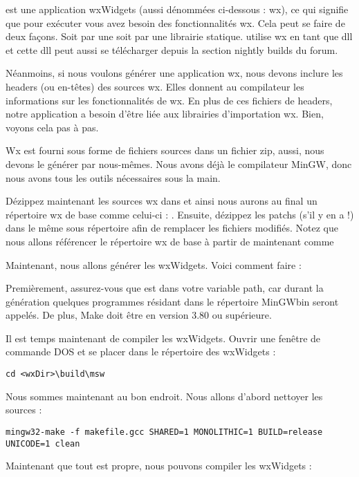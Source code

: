 \codeblocks est une application wxWidgets (aussi dénommées ci-dessous : wx), ce qui signifie que pour exécuter \codeblocks vous avez besoin des fonctionnalités wx. Cela peut se faire de deux façons. Soit par une  soit par une librairie statique. \codeblocks utilise wx en tant que dll et cette dll peut aussi se télécharger depuis la section nightly builds du forum.

Néanmoins, si nous voulons générer une application wx, nous devons inclure les headers (ou en-têtes) des sources wx. Elles donnent au compilateur les informations sur les fonctionnalités de wx. En plus de ces fichiers de headers, notre application a besoin d'être liée aux librairies d'importation wx. Bien, voyons cela pas à pas.

Wx est fourni sous forme de fichiers sources dans un fichier zip, aussi, nous devons le générer par nous-mêmes. Nous avons déjà le compilateur MinGW, donc nous avons tous les outils nécessaires sous la main.

Dézippez maintenant les sources wx dans  et ainsi nous aurons au final un répertoire wx de base comme celui-ci : . Ensuite, dézippez les patchs (s'il y en a !) dans le même sous répertoire afin de remplacer les fichiers modifiés. Notez que nous allons référencer le répertoire wx de base à partir de maintenant comme 

Maintenant, nous allons générer les wxWidgets. Voici comment faire :

Premièrement, assurez-vous que  est dans votre variable path, car durant la génération quelques programmes résidant dans le répertoire MinGW\osp bin seront appelés. De plus, Make doit être en version 3.80 ou supérieure.

Il est temps maintenant de compiler les wxWidgets. Ouvrir une fenêtre de commande DOS et se placer dans le répertoire des wxWidgets :

\begin{verbatim}
cd <wxDir>\build\msw
\end{verbatim}

Nous sommes maintenant au bon endroit. Nous allons d'abord nettoyer les sources :

\begin{verbatim}
mingw32-make -f makefile.gcc SHARED=1 MONOLITHIC=1 BUILD=release UNICODE=1 clean
\end{verbatim}

Maintenant que tout est propre, nous pouvons compiler les wxWidgets :

